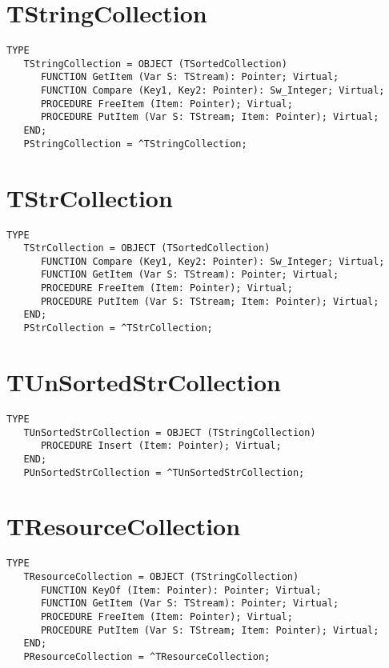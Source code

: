 \section{TStringCollection}
\label{se:TStringCollection}

\begin{verbatim}
TYPE
   TStringCollection = OBJECT (TSortedCollection)
      FUNCTION GetItem (Var S: TStream): Pointer; Virtual;
      FUNCTION Compare (Key1, Key2: Pointer): Sw_Integer; Virtual;
      PROCEDURE FreeItem (Item: Pointer); Virtual;
      PROCEDURE PutItem (Var S: TStream; Item: Pointer); Virtual;
   END;
   PStringCollection = ^TStringCollection;
\end{verbatim}

\section{TStrCollection}
\label{se:TStrCollection}

\begin{verbatim}
TYPE
   TStrCollection = OBJECT (TSortedCollection)
      FUNCTION Compare (Key1, Key2: Pointer): Sw_Integer; Virtual;
      FUNCTION GetItem (Var S: TStream): Pointer; Virtual;
      PROCEDURE FreeItem (Item: Pointer); Virtual;
      PROCEDURE PutItem (Var S: TStream; Item: Pointer); Virtual;
   END;
   PStrCollection = ^TStrCollection;
\end{verbatim}


\section{TUnSortedStrCollection}
\label{se:TUnSortedStrCollection}

\begin{verbatim}
TYPE
   TUnSortedStrCollection = OBJECT (TStringCollection)
      PROCEDURE Insert (Item: Pointer); Virtual;
   END;
   PUnSortedStrCollection = ^TUnSortedStrCollection;
\end{verbatim}

\section{TResourceCollection}
\label{se:TResourceCollection}

\begin{verbatim}
TYPE
   TResourceCollection = OBJECT (TStringCollection)
      FUNCTION KeyOf (Item: Pointer): Pointer; Virtual;
      FUNCTION GetItem (Var S: TStream): Pointer; Virtual;
      PROCEDURE FreeItem (Item: Pointer); Virtual;
      PROCEDURE PutItem (Var S: TStream; Item: Pointer); Virtual;
   END;
   PResourceCollection = ^TResourceCollection;
\end{verbatim}

